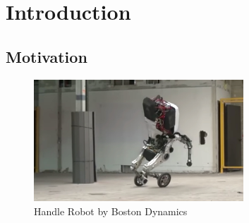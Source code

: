 \chapter{Introduction}

\graphicspath{{./Figures/Introduction/}}



\section{Motivation}
\begin {figure}[h]
\centering
\includegraphics[width=0.7\textwidth]{boston-dynamics-handle-robot}
\caption{Handle Robot by Boston Dynamics\cite{handle}}
\label{fig:Handle}
\end {figure}


